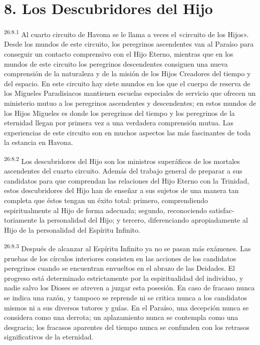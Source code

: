 \section*{8. Los Descubridores del Hijo}
\par
\textsuperscript{26:8.1} Al cuarto circuito de Havona se le llama a veces el «circuito de los Hijos». Desde los mundos de este circuito, los peregrinos ascendentes van al Paraíso para conseguir un contacto comprensivo con el Hijo Eterno, mientras que en los mundos de este circuito los peregrinos descendentes consiguen una nueva comprensión de la naturaleza y de la misión de los Hijos Creadores del tiempo y del espacio. En este circuito hay siete mundos en los que el cuerpo de reserva de los Migueles Paradisiacos mantienen escuelas especiales de servicio que ofrecen un ministerio mutuo a los peregrinos ascendentes y descendentes; en estos mundos de los Hijos Migueles es donde los peregrinos del tiempo y los peregrinos de la eternidad llegan por primera vez a una verdadera comprensión mutua. Las experiencias de este circuito son en muchos aspectos las más fascinantes de toda la estancia en Havona.

\par
\textsuperscript{26:8.2} Los descubridores del Hijo son los ministros superáficos de los mortales ascendentes del cuarto circuito. Además del trabajo general de preparar a sus candidatos para que comprendan las relaciones del Hijo Eterno con la Trinidad, estos descubridores del Hijo han de enseñar a sus sujetos de una manera tan completa que éstos tengan un éxito total: primero, comprendiendo espiritualmente al Hijo de forma adecuada; segundo, reconociendo satisfac-toriamente la personalidad del Hijo; y tercero, diferenciando apropiadamente al Hijo de la personalidad del Espíritu Infinito.

\par
\textsuperscript{26:8.3} Después de alcanzar al Espíritu Infinito ya no se pasan más exámenes. Las pruebas de los círculos interiores consisten en las acciones de los candidatos peregrinos cuando se encuentran envueltos en el abrazo de las Deidades. El progreso está determinado estrictamente por la espiritualidad del individuo, y nadie salvo los Dioses se atreven a juzgar esta posesión. En caso de fracaso nunca se indica una razón, y tampoco se reprende ni se critica nunca a los candidatos mismos ni a sus diversos tutores y guías. En el Paraíso, una decepción nunca se considera como una derrota; un aplazamiento nunca se contempla como una desgracia; los fracasos aparentes del tiempo nunca se confunden con los retrasos significativos de la eternidad.

